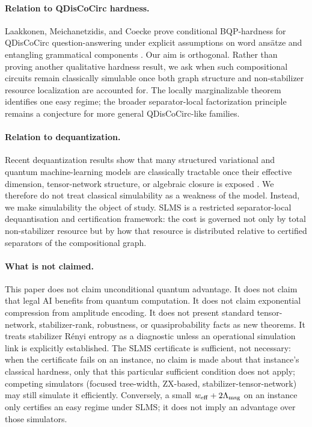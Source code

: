 \paragraph{Relation to QDisCoCirc hardness.}
Laakkonen, Meichanetzidis, and Coecke prove conditional BQP-hardness for QDisCoCirc question-answering under explicit assumptions on word ans\"atze and entangling grammatical components \citep{LaakkonenMeichanetzidisCoecke2024}. Our aim is orthogonal. Rather than proving another qualitative hardness result, we ask when such compositional circuits remain classically simulable once both graph structure and non-stabilizer resource localization are accounted for. The locally marginalizable theorem identifies one easy regime; the broader separator-local factorization principle remains a conjecture for more general QDisCoCirc-like families.

\paragraph{Relation to dequantization.}
Recent dequantization results show that many structured variational and quantum machine-learning models are classically tractable once their effective dimension, tensor-network structure, or algebraic closure is exposed \citep{Tang2019,ChiaEtAl2020,Tang2022,ShinTeoJeong2024}. We therefore do not treat classical simulability as a weakness of the model. Instead, we make simulability the object of study. SLMS is a restricted separator-local dequantisation and certification framework: the cost is governed not only by total non-stabilizer resource but by how that resource is distributed relative to certified separators of the compositional graph.

\paragraph{What is not claimed.}
This paper does not claim unconditional quantum advantage. It does not claim that legal AI benefits from quantum computation. It does not claim exponential compression from amplitude encoding. It does not present standard tensor-network, stabilizer-rank, robustness, or quasiprobability facts as new theorems. It treats stabilizer R\'enyi entropy as a diagnostic unless an operational simulation link is explicitly established. The SLMS certificate is sufficient, not necessary: when the certificate fails on an instance, no claim is made about that instance's classical hardness, only that this particular sufficient condition does not apply; competing simulators (focused tree-width, ZX-based, stabilizer-tensor-network) may still simulate it efficiently. Conversely, a small \(w_{\mathrm{eff}}+2\Lambda_{\mathrm{msg}}\) on an instance only certifies an easy regime under SLMS; it does not imply an advantage over those simulators.

